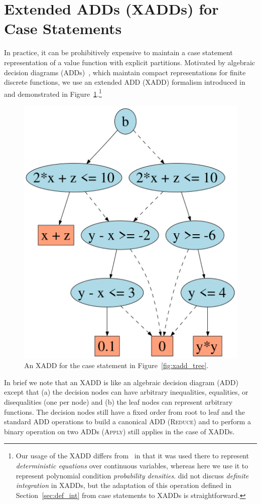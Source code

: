 \documentclass[letterpaper]{article}
\begin{document}
\section{Extended ADDs (XADDs) for Case Statements}

In practice, it can be prohibitively expensive to maintain a case
statement representation of a value function with explicit partitions.
Motivated by algebraic decision diagrams (ADDs)~\cite{bahar93add},
which maintain compact representations for finite discrete functions,
we use an extended ADD (XADD) formalism introduced 
in~\cite{uai11} and demonstrated in 
Figure~\ref{fig:xadd}.\footnote{Our usage of the XADD differs
from~\cite{uai11} in that it was used there to represent
\emph{deterministic equations} over continuous variables, whereas
here we use it to represent polynomial condition \emph{probability
densities}.  \cite{uai11} did not discuss \emph{definite integration} in XADDs,
but the adaptation of this operation defined in 
Section~\ref{sec:def_int} from case statements to XADDs is straightforward.}

\begin{figure}[t!]
\begin{center}
\vspace{-1mm}
\includegraphics[width=.2\textwidth]{norm_unif.pdf}
\end{center}
\vspace{-2mm}
\caption{\footnotesize An XADD for the case statement in Figure~\ref{fig:xadd_tree}.} \label{fig:xadd}
\vspace{-7mm}
\end{figure}

In brief we note that an XADD is like an algebraic decision 
diagram (ADD)~\cite{bahar93add} except that (a) the decision
nodes can have arbitrary inequalities, equalities, or disequalities (one
per node) and (b) the leaf nodes can represent arbitrary functions.
The decision nodes still have a fixed order from root to leaf
and the standard ADD
operations to build a canonical ADD (\textsc{Reduce}) and 
to perform a binary operation on two ADDs (\textsc{Apply}) 
still applies in the case of XADDs. 
\end{document}
